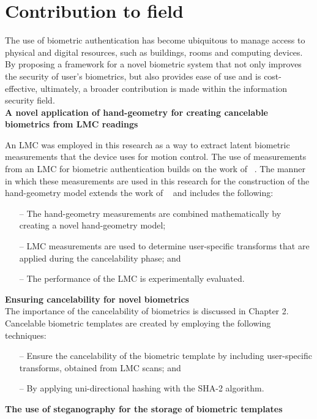 \section{Contribution to field}
The use of biometric authentication has become ubiquitous to manage access to physical and digital resources, such as buildings, rooms and computing devices. By proposing a framework for a novel biometric system that not only improves the security of user's biometrics, but also provides ease of use and is cost-effective, ultimately, a broader contribution is made within the information security field. \\

\textbf{A novel application of hand-geometry for creating cancelable biometrics from LMC readings}

An LMC was employed in this research as a way to extract latent biometric measurements that the device uses for motion control. The use of measurements from an LMC for biometric authentication builds on the work of ~\cite{Chan2015}. The manner in which these measurements are used in this research for the construction of the hand-geometry model extends the work of ~\cite{Chan2015} and includes the following:
\begin{itemize}
    \item[--] The hand-geometry measurements are combined mathematically by creating a novel hand-geometry model;
    \item[--] LMC measurements are used to determine user-specific transforms that are applied during the cancelability phase; and
    \item[--] The performance of the LMC is experimentally evaluated.
\end{itemize}

\textbf{Ensuring cancelability for novel biometrics}\\
The importance of the cancelability of biometrics is discussed in Chapter 2. Cancelable biometric templates are created by employing the following techniques: 
\begin{itemize}
    \item[--] Ensure the cancelability of the biometric template by including user-specific transforms, obtained from LMC scans; and
    \item[--] By applying uni-directional hashing with the SHA-2 algorithm.
\end{itemize}

\textbf{The use of steganography for the storage of biometric templates}

